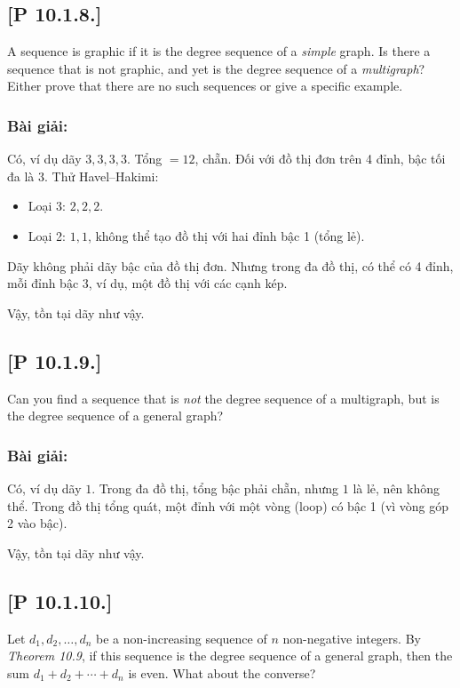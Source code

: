\documentclass[a4paper,12pt]{article}
\begin{document}
\subsection*{[P 10.1.8.]} A sequence is graphic if it is the degree sequence of a \textit{simple} graph. Is there a sequence that is not graphic, and yet is the degree sequence of a \textit{multigraph}? Either prove that there are no such sequences or give a specific example.

\subsubsection*{Bài giải:}
Có, ví dụ dãy \( 3, 3, 3, 3 \). Tổng \( = 12 \), chẵn. Đối với đồ thị đơn trên 4 đỉnh, bậc tối đa là 3. Thử Havel–Hakimi:
\begin{itemize}
    \item Loại 3: \( 2, 2, 2 \).
    \item Loại 2: \( 1, 1 \), không thể tạo đồ thị với hai đỉnh bậc 1 (tổng lẻ).
\end{itemize}
Dãy không phải dãy bậc của đồ thị đơn. Nhưng trong đa đồ thị, có thể có 4 đỉnh, mỗi đỉnh bậc 3, ví dụ, một đồ thị với các cạnh kép.

Vậy, tồn tại dãy như vậy.

\subsection*{[P 10.1.9.]} Can you find a sequence that is \textit{not} the degree sequence of a multigraph, but is the degree sequence of a general graph?

\subsubsection*{Bài giải:}
Có, ví dụ dãy \( 1 \). Trong đa đồ thị, tổng bậc phải chẵn, nhưng \( 1 \) là lẻ, nên không thể. Trong đồ thị tổng quát, một đỉnh với một vòng (loop) có bậc 1 (vì vòng góp 2 vào bậc).

Vậy, tồn tại dãy như vậy.

\subsection*{[P 10.1.10.]} Let $d_1, d_2, \ldots, d_n$ be a non-increasing sequence of $n$ non-negative integers. By \textit{Theorem 10.9}, if this sequence is the degree sequence of a general graph, then the sum $d_1 + d_2 + \cdots + d_n$ is even. What about the converse?
\end{document}
